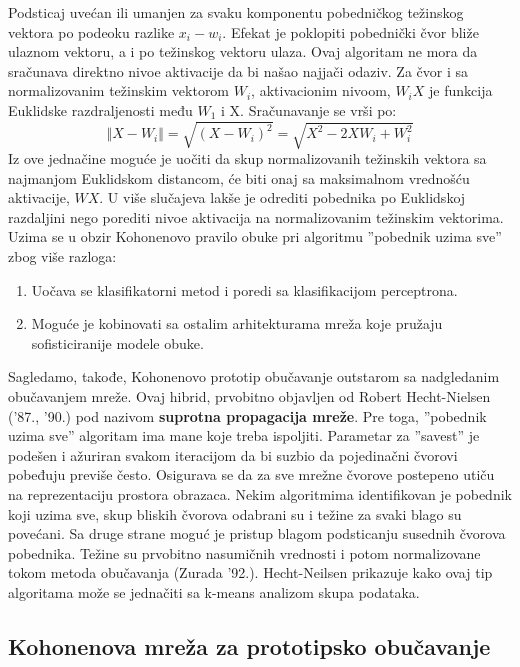 \documentclass[fontsize=11bp, paper=a4]{scrarticle}
\begin{document}
Podsticaj uvećan ili umanjen za svaku komponentu pobedničkog težinskog vektora po podeoku razlike $x_i - w_i$. Efekat je poklopiti pobednički čvor bliže ulaznom vektoru, a i po težinskog vektoru ulaza. Ovaj algoritam ne mora da sračunava direktno nivoe aktivacije da bi našao najjači odaziv. Za čvor i sa normalizovanim težinskim vektorom $W_i$, aktivacionim nivoom, $W_i X$ je funkcija Euklidske razdraljenosti među $W_1$ i X. Sračunavanje se vrši po:
$$
\Vert X - W_i \Vert =
\sqrt{( X - W_i )^2} =
\sqrt{X^2 - 2XW_i + W_i^2}
$$
Iz ove jednačine moguće je uočiti da skup normalizovanih težinskih vektora sa najmanjom Euklidskom distancom, će biti onaj sa maksimalnom vrednošću aktivacije, $WX$. U više slučajeva lakše je odrediti pobednika po Euklidskoj razdaljini nego porediti nivoe aktivacija na normalizovanim težinskim vektorima.
Uzima se u obzir Kohonenovo pravilo obuke pri algoritmu ''pobednik uzima sve'' zbog više razloga:
\begin{enumerate}
    \item Uočava se klasifikatorni metod i poredi sa klasifikacijom perceptrona.
    \item Moguće je kobinovati sa ostalim arhitekturama mreža koje pružaju sofisticiranije modele obuke. 
\end{enumerate}
Sagledamo, takođe, Kohonenovo prototip obučavanje outstarom sa nadgledanim obučavanjem mreže. Ovaj hibrid, prvobitno objavljen od Robert Hecht-Nielsen ('87., '90.) pod nazivom \textbf{suprotna propagacija mreže}. Pre toga, ''pobednik uzima sve'' algoritam ima mane koje treba ispoljiti. Parametar za ''savest'' je podešen i ažuriran svakom iteracijom da bi suzbio da pojedinačni čvorovi pobeđuju previše često. Osigurava se da za sve mrežne čvorove postepeno utiču na reprezentaciju prostora obrazaca. Nekim algoritmima identifikovan je pobednik koji uzima sve, skup bliskih čvorova odabrani su i težine za svaki blago su povećani. Sa druge strane moguć je pristup blagom podsticanju susednih čvorova pobednika. Težine su prvobitno nasumičnih vrednosti i potom normalizovane tokom metoda obučavanja (Zurada '92.). Hecht-Neilsen prikazuje kako ovaj tip algoritama može se jednačiti sa k-means analizom skupa podataka.

\subsection{Kohonenova mreža za prototipsko obučavanje}
\end{document}
